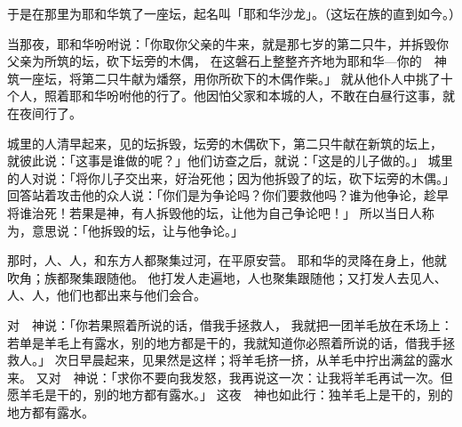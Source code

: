 {于是{}在那里为耶和华筑了一座坛，起名叫「耶和华沙龙」。（这坛在{}族的{}直到如今。）
\par }{\PP {}当那夜，耶和华吩咐{}说：「你取你父亲的牛来，就是那七岁的第二只牛，并拆毁你父亲为{}所筑的坛，砍下坛旁的木偶，
在这磐石上整整齐齐地为耶和华—你的　神筑一座坛，将第二只牛献为燔祭，用你所砍下的木偶作柴。」
就从他仆人中挑了十个人，照着耶和华吩咐他的行了。他因怕父家和本城的人，不敢在白昼行这事，就在夜间行了。
\par }{\PP {}城里的人清早起来，见{}的坛拆毁，坛旁的木偶砍下，第二只牛献在新筑的坛上，
就彼此说：「这事是谁做的呢？」他们访查之后，就说：「这是{}的儿子{}做的。」
城里的人对{}说：「将你儿子交出来，好治死他；因为他拆毁了{}的坛，砍下坛旁的木偶。」
回答站着攻击他的众人说：「你们是为{}争论吗？你们要救他吗？谁为他争论，趁早将谁治死！{}若果是神，有人拆毁他的坛，让他为自己争论吧！」
所以当日人称{}为{}，意思说：「他拆毁{}的坛，让{}与他争论。」
\par }{\PP {}那时，{}人、{}人，和东方人都聚集过河，在{}平原安营。
耶和华的灵降在{}身上，他就吹角；{}族都聚集跟随他。
他打发人走遍{}地，{}人也聚集跟随他；又打发人去见{}人、{}人、{}人，他们也都出来与他们会合。
\par }{\PP {}对　神说：「你若果照着所说的话，借我手拯救{}人，
我就把一团羊毛放在禾场上：若单是羊毛上有露水，别的地方都是干的，我就知道你必照着所说的话，借我手拯救{}人。」
次日早晨{}起来，见果然是这样；将羊毛挤一挤，从羊毛中拧出满盆的露水来。
又对　神说：「求你不要向我发怒，我再说这一次：让我将羊毛再试一次。但愿羊毛是干的，别的地方都有露水。」
这夜　神也如此行：独羊毛上是干的，别的地方都有露水。

}
